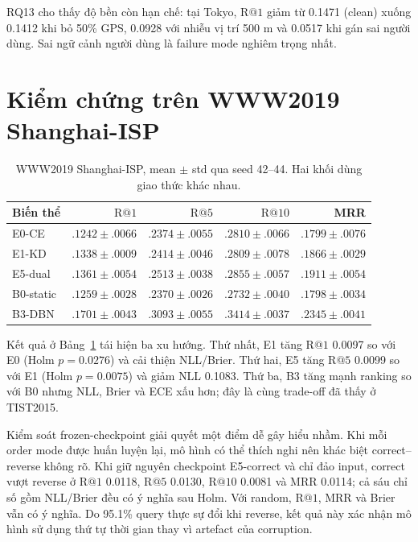 \documentclass[runningheads]{llncs}
\makeatletter
\newcommand{\Rone}{\mathrm{R@1}}
\newcommand{\Rfive}{\mathrm{R@5}}
\newcommand{\Rten}{\mathrm{R@10}}
\makeatother
\begin{document}
RQ13 cho thấy độ bền còn hạn chế: tại Tokyo, $\Rone$ giảm từ 0.1471 (clean) xuống 0.1412 khi bỏ 50\% GPS, 0.0928 với nhiễu vị trí 500 m và 0.0517 khi gán sai người dùng. Sai ngữ cảnh người dùng là failure mode nghiêm trọng nhất.

\section{Kiểm chứng trên WWW2019 Shanghai-ISP}

\begin{table}[H]
\caption{WWW2019 Shanghai-ISP, mean $\pm$ std qua seed 42--44. Hai khối dùng giao thức khác nhau.}
\label{tab:www}
\centering
\small
\begin{tabular}{@{}lrrrr@{}}
\toprule
Biến thể & $\Rone$ & $\Rfive$ & $\Rten$ & MRR\\
\midrule
E0-CE & $.1242\pm.0066$ & $.2374\pm.0055$ & $.2810\pm.0066$ & $.1799\pm.0076$\\
E1-KD & $.1338\pm.0009$ & $.2414\pm.0046$ & $.2809\pm.0078$ & $.1866\pm.0029$\\
E5-dual & $\mathbf{.1361\pm.0054}$ & $\mathbf{.2513\pm.0038}$ & $\mathbf{.2855\pm.0057}$ & $\mathbf{.1911\pm.0054}$\\
\midrule
B0-static & $.1259\pm.0028$ & $.2370\pm.0026$ & $.2732\pm.0040$ & $.1798\pm.0034$\\
B3-DBN & $\mathbf{.1701\pm.0043}$ & $\mathbf{.3093\pm.0055}$ & $\mathbf{.3414\pm.0037}$ & $\mathbf{.2345\pm.0041}$\\
\bottomrule
\end{tabular}
\end{table}

Kết quả ở Bảng~\ref{tab:www} tái hiện ba xu hướng. Thứ nhất, E1 tăng $\Rone$ 0.0097 so với E0 (Holm $p=0.0276$) và cải thiện NLL/Brier. Thứ hai, E5 tăng $\Rfive$ 0.0099 so với E1 (Holm $p=0.0075$) và giảm NLL 0.1083. Thứ ba, B3 tăng mạnh ranking so với B0 nhưng NLL, Brier và ECE xấu hơn; đây là cùng trade-off đã thấy ở TIST2015.

Kiểm soát frozen-checkpoint giải quyết một điểm dễ gây hiểu nhầm. Khi mỗi order mode được huấn luyện lại, mô hình có thể thích nghi nên khác biệt correct--reverse không rõ. Khi giữ nguyên checkpoint E5-correct và chỉ đảo input, correct vượt reverse ở $\Rone$ 0.0118, $\Rfive$ 0.0130, $\Rten$ 0.0081 và MRR 0.0114; cả sáu chỉ số gồm NLL/Brier đều có ý nghĩa sau Holm. Với random, $\Rone$, MRR và Brier vẫn có ý nghĩa. Do 95.1\% query thực sự đổi khi reverse, kết quả này xác nhận mô hình sử dụng thứ tự thời gian thay vì artefact của corruption.
\end{document}
